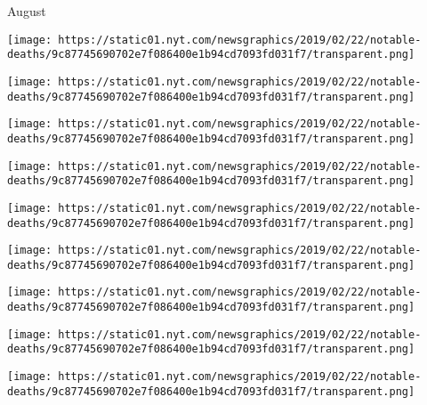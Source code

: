 August

\href{https://www.nytimes.com/2019/08/31/us/leslie-gelb-dead.html}{}

\texttt{[image: https://static01.nyt.com/newsgraphics/2019/02/22/notable-deaths/9c87745690702e7f086400e1b94cd7093fd031f7/transparent.png]}

\href{https://www.nytimes.com/2019/08/30/obituaries/valerie-harper-dead.html}{}

\texttt{[image: https://static01.nyt.com/newsgraphics/2019/02/22/notable-deaths/9c87745690702e7f086400e1b94cd7093fd031f7/transparent.png]}

\href{https://www.nytimes.com/2019/08/30/arts/dance/brunilda-ruiz-dead.html}{}

\texttt{[image: https://static01.nyt.com/newsgraphics/2019/02/22/notable-deaths/9c87745690702e7f086400e1b94cd7093fd031f7/transparent.png]}

\href{https://www.nytimes.com/2019/08/30/arts/takis-dead.html}{}

\texttt{[image: https://static01.nyt.com/newsgraphics/2019/02/22/notable-deaths/9c87745690702e7f086400e1b94cd7093fd031f7/transparent.png]}

\href{https://www.nytimes.com/2019/08/29/us/james-leavelle-dead.html}{}

\texttt{[image: https://static01.nyt.com/newsgraphics/2019/02/22/notable-deaths/9c87745690702e7f086400e1b94cd7093fd031f7/transparent.png]}

\href{https://www.nytimes.com/2019/08/29/movies/ningali-lawford-wolf-dead.html}{}

\texttt{[image: https://static01.nyt.com/newsgraphics/2019/02/22/notable-deaths/9c87745690702e7f086400e1b94cd7093fd031f7/transparent.png]}

\href{https://www.nytimes.com/2019/08/28/us/frances-crowe-dead.html}{}

\texttt{[image: https://static01.nyt.com/newsgraphics/2019/02/22/notable-deaths/9c87745690702e7f086400e1b94cd7093fd031f7/transparent.png]}

\href{https://www.nytimes.com/2019/08/26/style/isabel-toledo-dead.html}{}

\texttt{[image: https://static01.nyt.com/newsgraphics/2019/02/22/notable-deaths/9c87745690702e7f086400e1b94cd7093fd031f7/transparent.png]}

\href{https://www.nytimes.com/2019/08/24/world/sidney-rittenberg-dead.html}{}

\texttt{[image: https://static01.nyt.com/newsgraphics/2019/02/22/notable-deaths/9c87745690702e7f086400e1b94cd7093fd031f7/transparent.png]}


